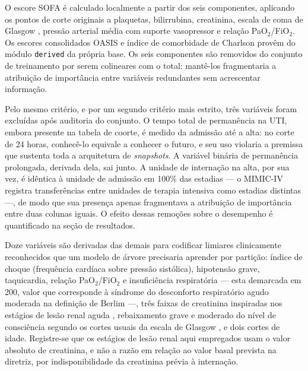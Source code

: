 \documentclass{ieeeaccess}
\begin{document}
O escore SOFA é calculado localmente a partir dos seis componentes, aplicando os pontos de corte originais \cite{Vincent1996} a plaquetas, bilirrubina, creatinina, escala de coma de Glasgow \cite{Teasdale1974}, pressão arterial média com suporte vasopressor e relação PaO$_2$/FiO$_2$. Os escores consolidados OASIS \cite{JohnsonOASIS2013} e índice de comorbidade de Charlson \cite{Charlson1987} provêm do módulo \texttt{derived} da própria base. Os seis componentes são removidos do conjunto de treinamento por serem colineares com o total: mantê-los fragmentaria a atribuição de importância entre variáveis redundantes sem acrescentar informação.

Pelo mesmo critério, e por um segundo critério mais estrito, três variáveis foram excluídas após auditoria do conjunto. O tempo total de permanência na UTI, embora presente na tabela de coorte, é medido da admissão até a alta: no corte de 24 horas, conhecê-lo equivale a conhecer o futuro, e seu uso violaria a premissa que sustenta toda a arquitetura de \textit{snapshots}. A variável binária de permanência prolongada, derivada dela, sai junto. A unidade de internação na alta, por sua vez, é idêntica à unidade de admissão em 100\% das estadias --- o MIMIC-IV registra transferências entre unidades de terapia intensiva como estadias distintas ---, de modo que sua presença apenas fragmentava a atribuição de importância entre duas colunas iguais. O efeito dessas remoções sobre o desempenho é quantificado na seção de resultados.

Doze variáveis são derivadas das demais para codificar limiares clinicamente reconhecidos que um modelo de árvore precisaria aprender por partição: índice de choque (frequência cardíaca sobre pressão sistólica), hipotensão grave, taquicardia, relação PaO$_2$/FiO$_2$ e insuficiência respiratória --- esta demarcada em 200, valor que corresponde à síndrome do desconforto respiratório agudo moderada na definição de Berlim \cite{Berlin2012} ---, três faixas de creatinina inspiradas nos estágios de lesão renal aguda \cite{KDIGO2012}, rebaixamento grave e moderado do nível de consciência segundo os cortes usuais da escala de Glasgow \cite{Teasdale1974}, e dois cortes de idade. Registre-se que os estágios de lesão renal aqui empregados usam o valor absoluto de creatinina, e não a razão em relação ao valor basal prevista na diretriz, por indisponibilidade da creatinina prévia à internação.
\end{document}
